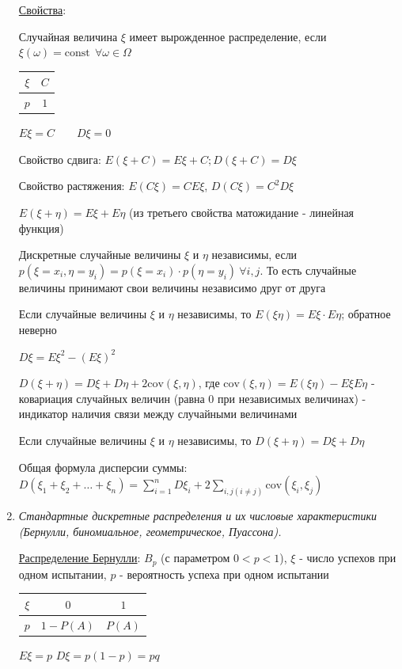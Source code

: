 \documentclass[12pt]{article}
\begin{document}
\begin{enumerate}
    \hyperlink{expectedvalueandvarianceproperties}{Свойства}: 

     Случайная величина $\xi$ имеет вырожденное распределение, если $\xi(\omega) = \mathrm{const} \ \ \forall \omega \in \Omega$

    \begin{tabular}{c|c}
        $\xi$ & $C$ \\
        \hline
        $p$   & $1$
    \end{tabular}

    $E\xi = C \qquad D\xi = 0$

     Свойство сдвига: $E(\xi + C) = E\xi + C; D (\xi + C) = D\xi$

     Свойство растяжения: $E(C\xi) = CE\xi$, $D(C\xi) = C^2 D\xi$

     $E(\xi + \eta) = E\xi + E\eta$ (из третьего свойства матожидание - линейная функция)

    \Def Дискретные случайные величины $\xi$ и $\eta$ независимы, если $p(\xi = x_i, \eta = y_i) = p(\xi = x_i) \cdot p(\eta = y_i) \ \forall i, j$.
    То есть случайные величины принимают свои величины независимо друг от друга

     Если случайные величины $\xi$ и $\eta$ независимы, то $E(\xi \eta) = E\xi \cdot E\eta$; обратное неверно

     $D\xi = E\xi^2 - (E\xi)^2$

    \Def $D(\xi + \eta) = D\xi + D\eta + 2\mathrm{cov} (\xi, \eta)$,
    где $\mathrm{cov}(\xi, \eta) = E(\xi\eta) - E\xi E\eta$ - ковариация случайных величин (равна 0 при независимых величинах) - индикатор наличия связи между случайными величинами

     Если случайные величины $\xi$ и $\eta$ независимы, то $D(\xi + \eta) = D\xi + D\eta$

     Общая формула дисперсии суммы: $D(\xi_1 + \xi_2 + \dots + \xi_n) = \sum_{i = 1}^n D \xi_i + 2\sum_{i, j (i \neq j)} \mathrm{cov} (\xi_i, \xi_j)$

    \item \textit{Стандартные дискретные распределения и их числовые характеристики (Бернулли, биномиальное, геометрическое, Пуассона).}
    
    \hyperlink{bernoullidistribution}{Распределение Бернулли}: $B_p$ (с параметром $0 < p < 1$), $\xi$ - число успехов при одном испытании, $p$ - вероятность успеха при одном испытании

    \begin{tabular}{c|c|c}
        $\xi$ & $0$        & $1$    \\
        \hline
        $p$   & $1 - P(A)$ & $P(A)$
    \end{tabular} \qquad\qquad $E\xi = p$ \qquad\qquad $D\xi = p(1 - p) = pq$


\end{enumerate}
\end{document}
